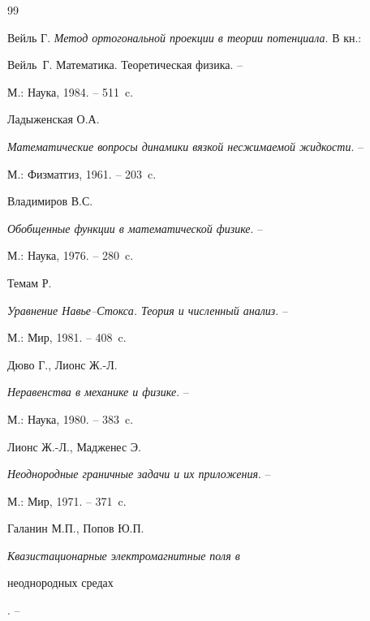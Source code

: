 \begin{thebibliography}{99}







Вейль Г. {\em Метод ортогональной проекции в теории потенциала}. В кн.:


Вейль~Г. Математика. Теоретическая физика. --


М.: Наука, 1984. -- 511~c.







Ладыженская О.А.


{\em Математические вопросы динамики вязкой несжимаемой жидкости}. --


М.: Физматгиз, 1961. -- 203~c.







Владимиров В.С.


{\em Обобщенные функции в математической физике}. --


М.: Наука, 1976. -- 280~c.







Темам Р.


{\em Уравнение Навье--Стокса. Теория и численный анализ}. --


М.: Мир, 1981. -- 408~c.







Дюво Г., Лионс Ж.-Л.


{\em Неравенства в механике и физике}. --


М.: Наука, 1980. -- 383~c.







Лионс Ж.-Л., Мадженес Э.


{\em Неоднородные граничные задачи и их приложения}. --


М.: Мир, 1971. -- 371~c.







Галанин М.П., Попов Ю.П. {\em Квазистационарные электромагнитные поля в


неоднородных средах}. --



\end{thebibliography}
